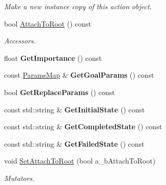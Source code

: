 \begin{DoxyCompactItemize}
\begin{DoxyCompactList}\small\item\em Make a new instance copy of this action object. \end{DoxyCompactList}\item 
\mbox{\label{class_create_action_a815aa769367621586abbf8aa94d54c19}} 
bool \hyperlink{class_create_action_a815aa769367621586abbf8aa94d54c19}{Attach\+To\+Root} () const
\begin{DoxyCompactList}\small\item\em Accessors. \end{DoxyCompactList}\item 
\mbox{\label{class_create_action_a72a439a5e9a23aeded689809b5bd286d}} 
float {\bfseries Get\+Importance} () const
\item 
\mbox{\label{class_create_action_acdfa0f60401f5c09c8958d669208d1a7}} 
const \hyperlink{class_params_map}{Params\+Map} \& {\bfseries Get\+Goal\+Params} () const
\item 
\mbox{\label{class_create_action_aed0f6d95fc1658125a4c29e05f71b95e}} 
bool {\bfseries Get\+Replace\+Params} () const
\item 
\mbox{\label{class_create_action_ac6274e6904fb6acd2222ed03e5a89023}} 
const std\+::string \& {\bfseries Get\+Initial\+State} () const
\item 
\mbox{\label{class_create_action_a0ec0f7381da9b705a63d6a9c536b674a}} 
const std\+::string \& {\bfseries Get\+Completed\+State} () const
\item 
\mbox{\label{class_create_action_af1b9fedd8d610c9e41119823266a0ba6}} 
const std\+::string \& {\bfseries Get\+Failed\+State} () const
\item 
\mbox{\label{class_create_action_ac63dddded3b3de271d0541afa64caf50}} 
void \hyperlink{class_create_action_ac63dddded3b3de271d0541afa64caf50}{Set\+Attach\+To\+Root} (bool a\+\_\+b\+Attach\+To\+Root)
\begin{DoxyCompactList}\small\item\em Mutators. \end{DoxyCompactList}\item 

\end{DoxyCompactItemize}
